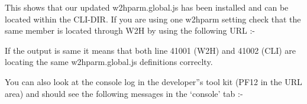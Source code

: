 \documentclass[letterpaper,10pt,english]{sphinxmanual}
\begin{document}
This shows that our updated w2hparm.global.js has been installed and can be located within the CLI-DIR. If you are using one w2hparm setting check that the same member is located through W2H by using the following URL :-

\begin{sphinxVerbatim}[commandchars=\\\{\}]
\end{sphinxVerbatim}

If the output is same it means that both line 41001 (W2H) and 41002 (CLI) are locating the same w2hparm.global.js definitions correclty.

You can also look at the console log in the developer”s tool kit (PF12 in the URL area) and should see the following messages in the ‘console’ tab :-
\end{document}
